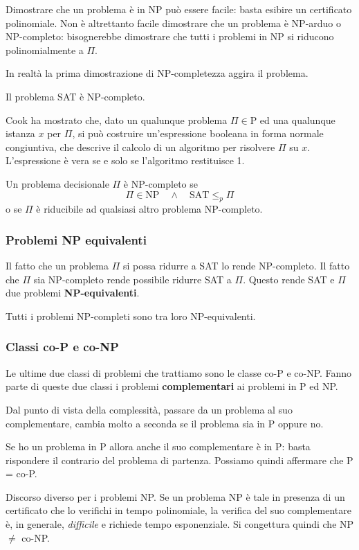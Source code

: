 Dimostrare che un problema \`e in NP pu\`o essere facile: basta esibire un certificato polinomiale. Non \`e altrettanto
facile dimostrare che un problema \`e NP-arduo o NP-completo: bisognerebbe dimostrare che tutti i problemi in NP si
riducono polinomialmente a $\Pi$.

In realt\`a la prima dimostrazione di NP-completezza aggira il problema.

\begin{theorem}[Cook]
	Il problema SAT \`e NP-completo.
\end{theorem}

Cook ha mostrato che, dato un qualunque problema $\Pi \in \text{P}$ ed una qualunque istanza $x$ per $\Pi$, si pu\`o
costruire un'espressione booleana in forma normale congiuntiva, che descrive il calcolo di un algoritmo per risolvere
$\Pi$ su $x$. L'espressione \`e vera se e solo se l'algoritmo restituisce 1.

\begin{theorem}
	Un problema decisionale $\Pi$ \`e NP-completo se
	\[ \Pi \in \text{NP} \quad \wedge \quad \text{SAT} \leq_p \Pi \]
	o se $\Pi$ \`e riducibile ad qualsiasi altro problema NP-completo.
\end{theorem}

\subsubsection{Problemi NP equivalenti}
Il fatto che un problema $\Pi$ si possa ridurre a SAT lo rende NP-completo. Il fatto che $\Pi$ sia NP-completo rende
possibile ridurre SAT a $\Pi$. Questo rende SAT e $\Pi$ due problemi \textbf{NP-equivalenti}.

\begin{theorem}
	Tutti i problemi NP-completi sono tra loro NP-equivalenti.
\end{theorem}

\subsubsection{Classi co-P e co-NP}
Le ultime due classi di problemi che trattiamo sono le classe co-P e co-NP. Fanno parte di queste due classi i problemi
\textbf{complementari} ai problemi in P ed NP.

Dal punto di vista della complessit\`a, passare da un problema al suo complementare, cambia molto a seconda se il problema
sia in P oppure no.

Se ho un problema in P allora anche il suo complementare \`e in P: basta rispondere il contrario del problema di partenza.
Possiamo quindi affermare che P = co-P.

Discorso diverso per i problemi NP. Se un problema NP \`e tale in presenza di un certificato che lo verifichi in tempo
polinomiale, la verifica del suo complementare \`e, in generale, \emph{difficile} e richiede tempo esponenziale. Si
congettura quindi che NP $\neq$ co-NP.